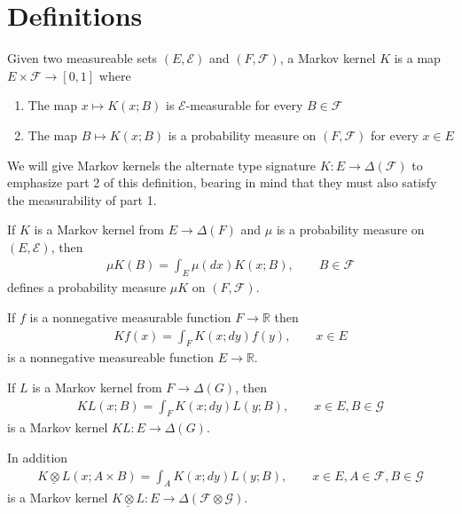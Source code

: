 \section{Definitions}
\begin{definition}
Given two measureable sets $(E,\mathcal{E})$ and $(F,\mathcal{F})$, a Markov kernel $K$ is a map $E\times \mathcal{F} \to [0,1]$ where
\begin{enumerate}
    \item The map $x\mapsto K(x;B)$ is $\mathcal{E}$-measurable for every $B\in\mathcal{F}$
    \item The map $B\mapsto K(x;B)$ is a probability measure on $(F,\mathcal{F})$ for every $x\in E$ 
\end{enumerate}

We will give Markov kernels the alternate type signature $K:E\to \Delta(\mathcal{F})$ to emphasize part 2 of this definition, bearing in mind that they must also satisfy the measurability of part 1.
\end{definition}

\begin{definition}\label{def:kernel_products}
If $K$ is a Markov kernel from $E\to \Delta(F)$ and $\mu$ is a probability measure on $(E,\mathcal{E})$, then
\begin{align}
    \mu K(B)=\int_E \mu(dx) K(x;B),\qquad B\in\mathcal{F}
\end{align}
defines a probability measure $\mu K$ on $(F,\mathcal{F})$.

If $f$ is a nonnegative measurable function $F\to \mathbb{R}$ then
\begin{align}
    Kf(x) = \int_F K(x;dy)f(y), \qquad x\in E
\end{align}
is a nonnegative measureable function $E\to \mathbb{R}$.

If $L$ is a Markov kernel from $F\to \Delta(G)$, then
\begin{align}
    KL(x;B) = \int_F K(x;dy) L(y;B),\qquad x\in E, B\in \mathcal{G}
\end{align}
is a Markov kernel $KL:E\to \Delta(G)$. \cite{cinlar_probability_2011}
\end{definition}

In addition
\begin{align}
    \underline{K\otimes L}(x;A\times B) = \int_A K(x;dy) L(y;B),\qquad x\in E, A\in \mathcal{F}, B\in \mathcal{G} \label{eq:outer_product}
\end{align}
is a Markov kernel $\underline{K\otimes L}:E\to \Delta(\mathcal{F}\otimes\mathcal{G})$.


